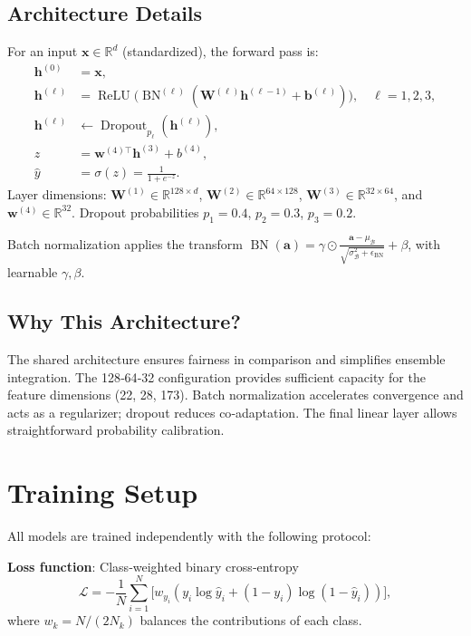 \documentclass[conference]{IEEEtran}
\begin{document}
\subsection{Architecture Details}
For an input $\mathbf{x} \in \mathbb{R}^{d}$ (standardized), the forward pass is:
\begin{align}
  \mathbf{h}^{(0)} &= \mathbf{x},\\
  \mathbf{h}^{(\ell)} &= \operatorname{ReLU}\!\big(\operatorname{BN}^{(\ell)}(\mathbf{W}^{(\ell)}\mathbf{h}^{(\ell-1)} + \mathbf{b}^{(\ell)})\big),\quad \ell=1,2,3,\\
  \mathbf{h}^{(\ell)} &\gets \operatorname{Dropout}_{p_\ell}(\mathbf{h}^{(\ell)}),\\
  z &= \mathbf{w}^{(4)\top}\mathbf{h}^{(3)} + b^{(4)},\\
  \hat{y} &= \sigma(z) = \frac{1}{1+e^{-z}}.
\end{align}
Layer dimensions: $\mathbf{W}^{(1)}\in\mathbb{R}^{128\times d}$, $\mathbf{W}^{(2)}\in\mathbb{R}^{64\times128}$, $\mathbf{W}^{(3)}\in\mathbb{R}^{32\times64}$, and $\mathbf{w}^{(4)}\in\mathbb{R}^{32}$. Dropout probabilities $p_1=0.4$, $p_2=0.3$, $p_3=0.2$.

Batch normalization applies the transform $\operatorname{BN}(\mathbf{a}) = \gamma \odot \frac{\mathbf{a}-\mu_{\mathcal{B}}}{\sqrt{\sigma^2_{\mathcal{B}}+\epsilon_{\mathrm{BN}}}} + \beta$, with learnable $\gamma,\beta$.

\subsection{Why This Architecture?}
The shared architecture ensures fairness in comparison and simplifies ensemble integration. The 128‑64‑32 configuration provides sufficient capacity for the feature dimensions (22, 28, 173). Batch normalization accelerates convergence and acts as a regularizer; dropout reduces co‑adaptation. The final linear layer allows straightforward probability calibration.

\section{Training Setup}
All models are trained independently with the following protocol:

\textbf{Loss function}: Class‑weighted binary cross‑entropy
\begin{equation}
  \mathcal{L} = -\frac{1}{N}\sum_{i=1}^{N} \big[ w_{y_i} (y_i\log\hat{y}_i + (1-y_i)\log(1-\hat{y}_i)) \big],
\end{equation}
where $w_k = N/(2N_k)$ balances the contributions of each class.
\end{document}
